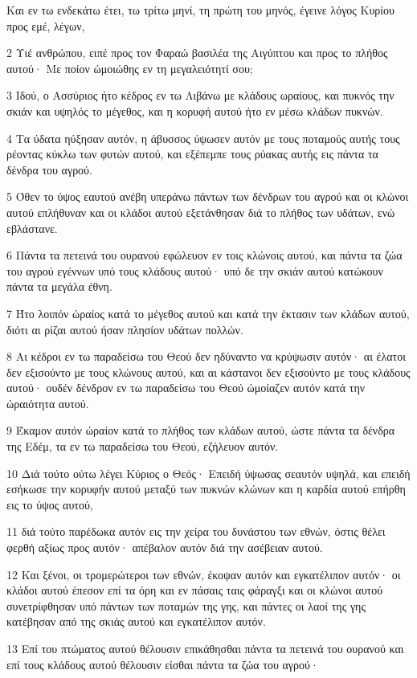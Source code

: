 \par Και εν τω ενδεκάτω έτει, τω τρίτω μηνί, τη πρώτη του μηνός, έγεινε λόγος Κυρίου προς εμέ, λέγων,
\par 2 Υιέ ανθρώπου, ειπέ προς τον Φαραώ βασιλέα της Αιγύπτου και προς το πλήθος αυτού· Με ποίον ώμοιώθης εν τη μεγαλειότητί σου;
\par 3 Ιδού, ο Ασσύριος ήτο κέδρος εν τω Λιβάνω με κλάδους ωραίους, και πυκνός την σκιάν και υψηλός το μέγεθος, και η κορυφή αυτού ήτο εν μέσω κλάδων πυκνών.
\par 4 Τα ύδατα ηύξησαν αυτόν, η άβυσσος ύψωσεν αυτόν με τους ποταμούς αυτής τους ρέοντας κύκλω των φυτών αυτού, και εξέπεμπε τους ρύακας αυτής εις πάντα τα δένδρα του αγρού.
\par 5 Όθεν το ύψος εαυτού ανέβη υπεράνω πάντων των δένδρων του αγρού και οι κλώνοι αυτού επλήθυναν και οι κλάδοι αυτού εξετάνθησαν διά το πλήθος των υδάτων, ενώ εβλάστανε.
\par 6 Πάντα τα πετεινά του ουρανού εφώλευον εν τοις κλώνοις αυτού, και πάντα τα ζώα του αγρού εγέννων υπό τους κλάδους αυτού· υπό δε την σκιάν αυτού κατώκουν πάντα τα μεγάλα έθνη.
\par 7 Ήτο λοιπόν ώραίος κατά το μέγεθος αυτού και κατά την έκτασιν των κλάδων αυτού, διότι αι ρίζαι αυτού ήσαν πλησίον υδάτων πολλών.
\par 8 Αι κέδροι εν τω παραδείσω του Θεού δεν ηδύναντο να κρύψωσιν αυτόν· αι έλατοι δεν εξισούντο με τους κλώνους αυτού, και αι κάστανοι δεν εξισούντο με τους κλάδους αυτού· ουδέν δένδρον εν τω παραδείσω του Θεού ώμοίαζεν αυτόν κατά την ώραιότητα αυτού.
\par 9 Έκαμον αυτόν ώραίον κατά το πλήθος των κλάδων αυτού, ώστε πάντα τα δένδρα της Εδέμ, τα εν τω παραδείσω του Θεού, εζήλευον αυτόν.
\par 10 Διά τούτο ούτω λέγει Κύριος ο Θεός· Επειδή ύψωσας σεαυτόν υψηλά, και επειδή εσήκωσε την κορυφήν αυτού μεταξύ των πυκνών κλώνων και η καρδία αυτού επήρθη εις το ύψος αυτού,
\par 11 διά τούτο παρέδωκα αυτόν εις την χείρα του δυνάστου των εθνών, όστις θέλει φερθή αξίως προς αυτόν· απέβαλον αυτόν διά την ασέβειαν αυτού.
\par 12 Και ξένοι, οι τρομερώτεροι των εθνών, έκοψαν αυτόν και εγκατέλιπον αυτόν· οι κλάδοι αυτού έπεσον επί τα όρη και εν πάσαις ταις φάραγξι και οι κλώνοι αυτού συνετρίφθησαν υπό πάντων των ποταμών της γης, και πάντες οι λαοί της γης κατέβησαν από της σκιάς αυτού και εγκατέλιπον αυτόν.
\par 13 Επί του πτώματος αυτού θέλουσιν επικάθησθαι πάντα τα πετεινά του ουρανού και επί τους κλάδους αυτού θέλουσιν είσθαι πάντα τα ζώα του αγρού·
